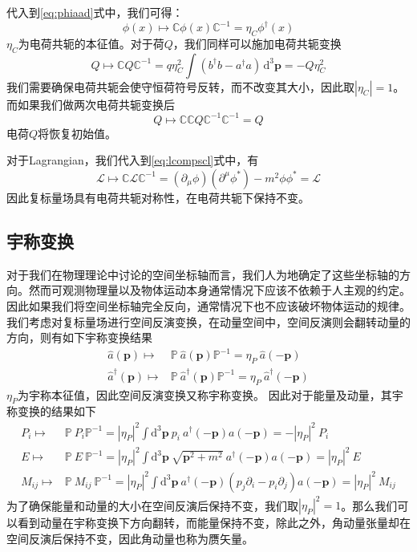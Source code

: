 代入到\eqref{eq:phiaad}式中，我们可得：
\begin{equation}
    \phi(x) \mapsto \mathbb{C}\phi(x)\mathbb{C}^{-1} = \eta_C\phi^\dagger(x)
\end{equation}
$\eta_C$为电荷共轭的本征值。对于荷$Q$，我们同样可以施加电荷共轭变换
\begin{equation}
    Q\mapsto \mathbb{C}Q\mathbb{C}^{-1} = q\eta_C^2\int(b^{\dagger}b-a^{\dagger}a)\,\mathrm{d}^3\boldsymbol{p} = -Q\eta_C^2
\end{equation}
我们需要确保电荷共轭会使守恒荷符号反转，而不改变其大小，因此取$|\eta_C|=1$。而如果我们做两次电荷共轭变换后
\begin{equation}
    Q\mapsto  \mathbb{C}\mathbb{C}Q\mathbb{C}^{-1}\mathbb{C}^{-1} = Q
\end{equation}
电荷$Q$将恢复初始值。

对于Lagrangian，我们代入到\eqref{eq:lcompscl}式中，有
\begin{equation}
    \mathscr{L}\mapsto \mathbb{C}\mathscr{L}\mathbb{C}^{-1} = (\partial_\mu \phi)(\partial^\mu \phi^*)-m^2\phi \phi^* = \mathscr{L}
\end{equation}
因此复标量场具有电荷共轭对称性，在电荷共轭下保持不变。

\subsection*{宇称变换}
对于我们在物理理论中讨论的空间坐标轴而言，我们人为地确定了这些坐标轴的方向。然而可观测物理量以及物体运动本身通常情况下应该不依赖于人主观的约定。因此如果我们将空间坐标轴完全反向，通常情况下也不应该破坏物体运动的规律。
我们考虑对复标量场进行空间反演变换，在动量空间中，空间反演则会翻转动量的方向，则有如下宇称变换结果
\begin{align}
    \hat{a}(\boldsymbol{p}) \mapsto& \mathbb{P}~\hat{a}(\boldsymbol{p}) \mathbb{P}^{-1} = \eta_P~\hat{a}(-\boldsymbol{p})\\
    \hat{a}^\dagger(\boldsymbol{p}) \mapsto& \mathbb{P}~\hat{a}^\dagger(\boldsymbol{p}) \mathbb{P}^{-1} = \eta_P~\hat{a}^\dagger(-\boldsymbol{p})
\end{align}
$\eta_P$为宇称本征值，因此空间反演变换又称宇称变换。
因此对于能量及动量，其宇称变换的结果如下
\begin{align}
    P_i \mapsto& \mathbb{P}~P_i \mathbb{P}^{-1} = |\eta_P|^2\int\mathrm{d}^3\boldsymbol{p}~ p_i~ a^\dagger(-\boldsymbol{p})a(-\boldsymbol{p}) = -|\eta_P|^2~P_i\\
    E \mapsto& \mathbb{P}~E~ \mathbb{P}^{-1} = |\eta_P|^2\int\mathrm{d}^3\boldsymbol{p}~ \sqrt{\boldsymbol{p}^2+m^2}~ a^\dagger(-\boldsymbol{p})a(-\boldsymbol{p}) = |\eta_P|^2~E\\
     M_{ij} \mapsto& \mathbb{P}~M_{ij}~ \mathbb{P}^{-1} = |\eta_P|^2\int\mathrm{d}^3\boldsymbol{p}~  a^\dagger(-\boldsymbol{p}) (p_j\partial_i  - p_i\partial_j ) a(-\boldsymbol{p}) = |\eta_P|^2~M_{ij}
\end{align}
为了确保能量和动量的大小在空间反演后保持不变，我们取$|\eta_P|^2 = 1$。那么我们可以看到动量在宇称变换下方向翻转，而能量保持不变，除此之外，角动量张量却在空间反演后保持不变，因此角动量也称为赝矢量。

